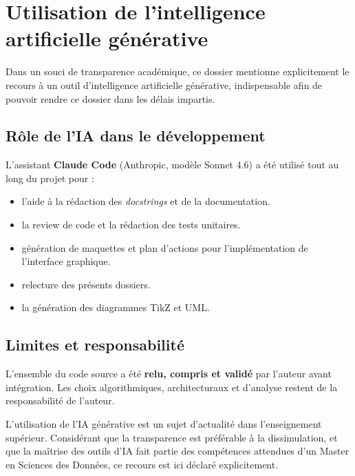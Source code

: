 \documentclass[12pt, a4paper, french]{report}
\begin{document}
\chapter{Utilisation de l'intelligence artificielle générative}

Dans un souci de transparence académique, ce dossier mentionne explicitement le recours à un outil d'intelligence artificielle générative, indispensable afin de pouvoir rendre ce dossier dans les délais impartis.

\section{Rôle de l'IA dans le développement}

L'assistant \textbf{Claude Code} (Anthropic, modèle Sonnet 4.6) a été utilisé tout au long du projet pour :

\begin{itemize}
  \item l'aide à la rédaction des \textit{docstrings} et de la documentation.
  \item la review de code et la rédaction des tests unitaires.
  \item génération de maquettes et plan d'actions pour l'implémentation de l'interface graphique.
  \item relecture des présents dossiers.
  \item la génération des diagrammes TikZ et UML.
\end{itemize}


\section{Limites et responsabilité}

L'ensemble du code source a été \textbf{relu, compris et validé} par l'auteur avant intégration. Les choix algorithmiques, architecturaux et d'analyse restent de la responsabilité de l'auteur.

\begin{notebox}
L'utilisation de l'IA générative est un sujet d'actualité dans l'enseignement supérieur. Considérant que la transparence est préférable à la dissimulation, et que la maîtrise des outils d'IA fait partie des compétences attendues d'un Master en Sciences des Données, ce recours est ici déclaré explicitement.
\end{notebox}
\end{document}

